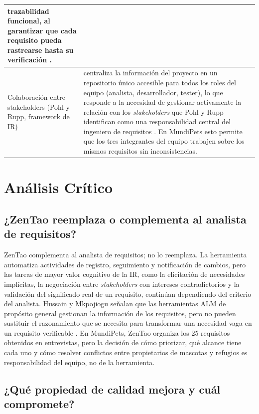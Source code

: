 \documentclass[journal,onecolumn]{IEEEtran}
\begin{document}
\begin{table}[H]
\begin{tabularx}{\textwidth}{|l|X|}
		\textbf{trazabilidad funcional}, al garantizar que cada requisito pueda
		rastrearse hasta su verificación \cite{iso25010}. \\
		\hline
		Colaboración entre stakeholders (Pohl y Rupp, framework de IR)
		& centraliza la información del proyecto en un repositorio único accesible
		para todos los roles del equipo (analista, desarrollador, tester), lo que
		responde a la necesidad de gestionar activamente la relación con los
		\textit{stakeholders} que Pohl y Rupp identifican como una responsabilidad
		central del ingeniero de requisitos \cite{pohl2015}. En MundiPets esto
		permite que los tres integrantes del equipo trabajen sobre los mismos
		requisitos sin inconsistencias. \\
		\hline
	\end{tabularx}
\end{table}

\section{Análisis Crítico}

\subsection{¿ZenTao reemplaza o complementa al analista de requisitos?}

ZenTao complementa al analista de requisitos; no lo reemplaza. La herramienta automatiza
actividades de registro, seguimiento y notificación de cambios, pero las tareas de mayor
valor cognitivo de la IR, como la elicitación de necesidades implícitas, la negociación entre
\textit{stakeholders} con intereses contradictorios y la validación del significado real de un
requisito, continúan dependiendo del criterio del analista. Hussain y Mkpojiogu señalan que
las herramientas ALM de propósito general gestionan la información de los requisitos, pero no
pueden sustituir el razonamiento que se necesita para transformar una necesidad vaga en un
requisito verificable \cite{hussain2022}. En MundiPets, ZenTao organiza los 25 requisitos
obtenidos en entrevistas, pero la decisión de cómo priorizar, qué alcance tiene cada uno y
cómo resolver conflictos entre propietarios de mascotas y refugios es responsabilidad del equipo,
no de la herramienta.

\subsection{¿Qué propiedad de calidad mejora y cuál compromete?}
\end{document}
